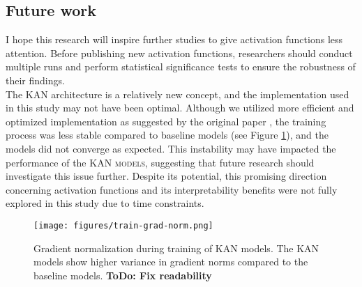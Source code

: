 \subsection{Future work}
\label{sec:future}
I hope this research will inspire further studies to give activation functions less attention. Before publishing new activation functions, researchers should conduct multiple runs and perform statistical significance tests to ensure the robustness of their findings. \\ 
The KAN architecture is a relatively new concept, and the implementation used in this study may not have been optimal. Although we utilized more efficient and optimized implementation as suggested by the original paper \cite{Liu2024}, the training process was less stable compared to baseline models (see Figure \ref{fig:grad-norm}), and the models did not converge as expected. This instability may have impacted the performance of the \textsc{KAN models}, suggesting that future research should investigate this issue further. Despite its potential, this promising direction concerning activation functions and its interpretability benefits were not fully explored in this study due to time constraints.

\begin{figure}[ht]
    \centering
    \texttt{[image: figures/train-grad-norm.png]}
    \caption{Gradient normalization during training of KAN models. The KAN models show higher variance in gradient norms compared to the baseline models. \textbf{ToDo: Fix readability}}
    \label{fig:grad-norm}
\end{figure}
